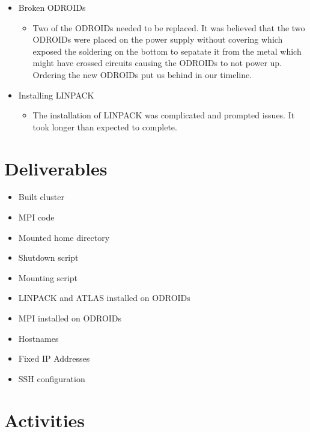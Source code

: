 \documentclass{article}
\begin{document}
\begin{itemize}
\begin{itemize}
\begin{itemize}
		\end{itemize}	
		\item Broken ODROIDs
		\begin{itemize}
			\item Two of the ODROIDs needed to be replaced. It was believed that the two ODROIDs were placed on the power supply without covering which exposed the soldering on the bottom to sepatate it from the metal which might have crossed circuits causing the ODROIDs to not power up. Ordering the new ODROIDs put us behind in our timeline.
		\end{itemize}
		\item Installing LINPACK
		\begin{itemize}
			\item The installation of LINPACK was complicated and prompted issues. It took longer than expected to complete.
		\end{itemize}
	\end{itemize}
\end{itemize}

\section*{Deliverables}
\begin{itemize}
	\item Built cluster
	\item MPI code
	\item Mounted home directory
	\item Shutdown script
	\item Mounting script
	\item LINPACK and ATLAS installed on ODROIDs
	\item MPI installed on ODROIDs
	\item Hostnames
	\item Fixed IP Addresses
	\item SSH configuration
\end{itemize}

\section*{Activities}
\end{document}
